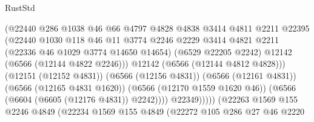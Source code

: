 \begin{lexlean}{RustStd}
\begin{coremodule}
{\begin{coremodule}
{{{{{{{{{{{{{{{{{{{{{{{{{{                                          (@22440
                                            @286
                                            @1038
                                            @46
                                            @66
                                            @4797
                                            @4828
                                            @4838
                                            @3414
                                            @4811
                                            @2211
                                            @22395
                                            (@22440
                                              @1030
                                              @118
                                              @46
                                              @11
                                              @3774
                                              @2246
                                              @2229
                                              @3414
                                              @4821
                                              @2211
                                              (@22336 @46 @1029 @3774 @14650 @14654)
                                              (@6529 @22205 @2242)
                                              @12142
                                              (@6566 (@12144 @4822 @2246)))
                                            @12142
                                            (@6566 (@12144 @4812 @4828)))
                                          (@12151 (@12152 @4831))
                                          (@6566 (@12156 @4831))
                                          (@6566 (@12161 @4831))
                                          (@6566 (@12165 @4831 @1620))
                                          (@6566 (@12170 @1559 @1620 @46))
                                          (@6566 (@6604 (@6605 (@12176 @4831)) @2242))))
                                      @22349)))))
                            (@22263
                              @1569
                              @155
                              @2246
                              @4849
                              (@22234
                                @1569
                                @155
                                @4849
                                (@22272
                                  @105
                                  @286
                                  @27
                                  @46
                                  @2220
}}}}}}}}}}}}}}}}}}}}}}}}}}
\end{coremodule}}
\end{coremodule}
\end{lexlean}
